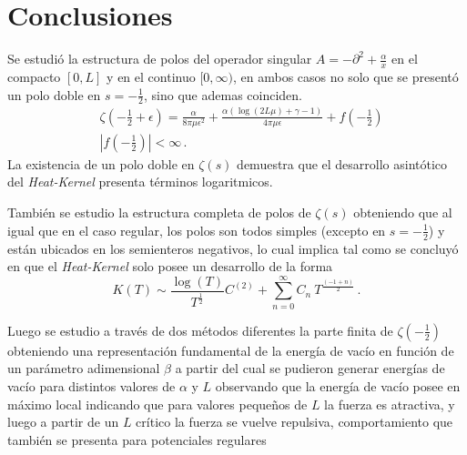 \chapter{Conclusiones}

Se estudió la estructura de polos del operador singular $A = - \partial ^2 + \frac{\alpha}{x} $ en el compacto $[0,L]$ y en el continuo $[0, \infty)$, en ambos casos no solo que se presentó un polo doble en $s= -\frac{1}{2}$, sino que ademas coinciden.
\begin{align*}
&
	\zeta \left( - \frac{1}{2} + \epsilon \right) = 
	\frac{\alpha}{8 \pi \mu  \epsilon  ^2} +
	\frac{\alpha \left( \log (2 L \mu ) + \gamma -1  \right)}{4 \pi \mu  \epsilon } +
	f \left( - \frac{1}{2} \right)
\\
&
	\left| f \left( - \frac{1}{2} \right) \right| < \infty
\, .
\end{align*}
La existencia de un polo doble en $\zeta (s)$ demuestra que el desarrollo asintótico del {\it Heat-Kernel} presenta términos logaritmicos.

 También  se estudio la estructura completa de polos de $\zeta \left(s \right)$ obteniendo que al igual que en el caso regular, los polos son todos simples (excepto en $s= - \frac{1}{2}$) y están ubicados en los semienteros negativos, lo cual implica tal como se concluyó en \cite{Callias1980} que el {\it Heat-Kernel} solo posee un desarrollo de la forma  
\begin{equation}
	K(T) \sim 
	\frac{ \log (T)}{T ^{\frac{1}{2} }} C ^{(2)} +
	\sum _{n=0} ^{\infty}
	C _n  \ 
	T^{\frac{(-1+n)}{2}} 
\, .
\end{equation}


Luego se estudio a través de dos métodos diferentes la parte finita de $\zeta \left( - \frac{1}{2} \right)$ obteniendo una representación fundamental de la energía de vacío en función de un parámetro adimensional $\beta$ a partir del cual se pudieron generar energías de vacío para distintos valores de $\alpha$ y $L$ observando que la energía de vacío posee en máximo local indicando que para valores pequeños de $L$ la fuerza es atractiva, y luego a partir de un $L$ crítico la fuerza se vuelve repulsiva, comportamiento que también se presenta para potenciales regulares \cite{Beauregard_2013}



